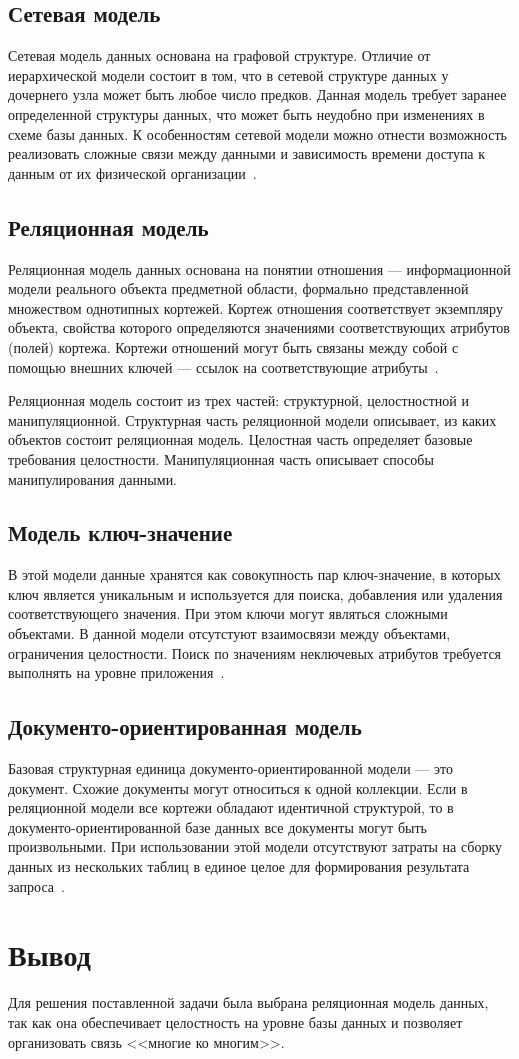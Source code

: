 \subsection{Сетевая модель}
Сетевая модель данных основана на графовой структуре. 
Отличие от иерархической модели состоит в том, что в сетевой структуре данных у дочернего узла может быть любое число предков. Данная модель требует заранее определенной структуры данных, что может быть неудобно при изменениях в схеме базы данных. К особенностям сетевой модели можно отнести возможность реализовать сложные связи между данными и зависимость времени доступа к данным от их физической организации~\cite{s2}.

\subsection{Реляционная модель}
Реляционная модель данных основана на понятии отношения --- информационной модели реального объекта
предметной области, формально представленной множеством однотипных кортежей.
Кортеж отношения соответствует экземпляру объекта, свойства которого определяются значениями соответствующих атрибутов (полей) кортежа.
Кортежи отношений могут быть связаны между собой с помощью внешних ключей --- ссылок на соответствующие атрибуты~\cite{s2}.

Реляционная модель состоит из трех частей: структурной, целостностной и манипуляционной.
Структурная часть реляционной модели описывает, из каких объектов состоит реляционная модель.
Целостная часть определяет базовые требования целостности.
Манипуляционная часть описывает способы манипулирования данными.

\subsection{Модель ключ-значение}
В этой модели данные хранятся как совокупность пар ключ-значение, в которых ключ является уникальным и используется для поиска, добавления или удаления соответствующего значения.
При этом ключи могут являться сложными объектами.
В данной модели отсутстуют взаимосвязи между объектами, ограничения целостности.
Поиск по значениям неключевых атрибутов требуется выполнять на уровне приложения~\cite{s1}.

\subsection{Документо-ориентированная модель}
Базовая структурная единица документо-ориентированной модели --- это документ.
Схожие документы могут относиться к одной коллекции.
Если в реляционной модели все кортежи обладают идентичной структурой, то в документо-ориентированной базе данных все документы могут быть произвольными.
При использовании этой модели отсутствуют затраты на сборку данных из нескольких таблиц в единое целое для формирования результата запроса~\cite{s1}.

\section*{Вывод}
Для решения поставленной задачи была выбрана реляционная модель данных, так как она 
обеспечивает целостность на уровне базы данных и позволяет  организовать связь <<многие ко многим>>.
\clearpage

